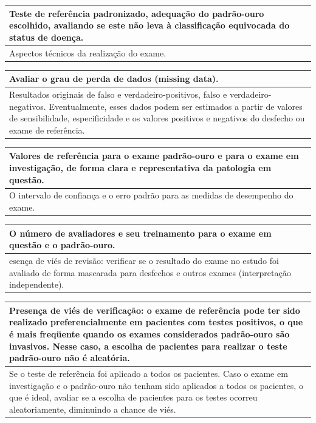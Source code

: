 \documentclass[12pt,brazil,oneside]{book}
\begin{document}
\begin{longtable}[]{@{}l@{}}
\toprule
Teste de referência padronizado, adequação do padrão-ouro escolhido, avaliando se este não leva à classificação equivocada do status de doença.\tabularnewline
\midrule
\endhead
Aspectos técnicos da realização do exame.\tabularnewline
\bottomrule
\end{longtable}

\begin{longtable}[]{@{}l@{}}
\toprule
Avaliar o grau de perda de dados (missing data).\tabularnewline
\midrule
\endhead
Resultados originais de falso e verdadeiro-positivos, falso e verdadeiro-negativos. Eventualmente, esses dados podem ser estimados a partir de valores de sensibilidade, especificidade e os valores positivos e negativos do desfecho ou exame de referência.\tabularnewline
\bottomrule
\end{longtable}

\begin{longtable}[]{@{}l@{}}
\toprule
Valores de referência para o exame padrão-ouro e para o exame em investigação, de forma clara e representativa da patologia em questão.\tabularnewline
\midrule
\endhead
O intervalo de confiança e o erro padrão para as medidas de desempenho do exame.\tabularnewline
\bottomrule
\end{longtable}

\begin{longtable}[]{@{}l@{}}
\toprule
O número de avaliadores e seu treinamento para o exame em questão e o padrão-ouro.\tabularnewline
\midrule
\endhead
esença de viés de revisão: verificar se o resultado do exame no estudo foi avaliado de forma mascarada para desfechos e outros exames (interpretação independente).\tabularnewline
\bottomrule
\end{longtable}

\begin{longtable}[]{@{}l@{}}
\toprule
Presença de viés de verificação: o exame de referência pode ter sido realizado preferencialmente em pacientes com testes positivos, o que é mais freqüente quando os exames considerados padrão-ouro são invasivos. Nesse caso, a escolha de pacientes para realizar o teste padrão-ouro não é aleatória.\tabularnewline
\midrule
\endhead
Se o teste de referência foi aplicado a todos os pacientes. Caso o exame em investigação e o padrão-ouro não tenham sido aplicados a todos os pacientes, o que é ideal, avaliar se a escolha de pacientes para os testes ocorreu aleatoriamente, diminuindo a chance de viés.\tabularnewline
\bottomrule
\end{longtable}
\end{document}
